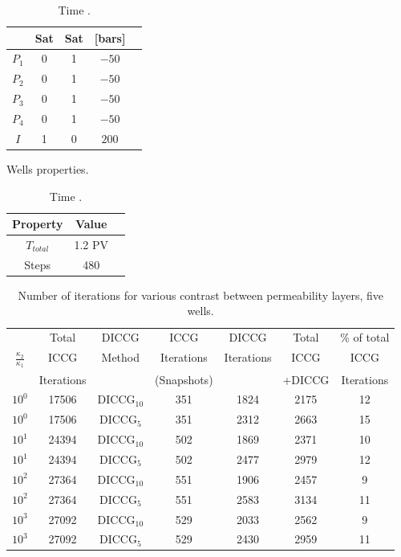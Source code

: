 \documentclass[12pt]{article}
\begin{document}
{\begin{table}[!ht]
\begin{minipage}{.5\textwidth}
\begin{tabular}{ |c|c|c|c|c|}
&Sat&Sat&[bars]\\
\hline
$P_1$&     0&    1 & $-50$ \\  
$P_2$& 0& 1& $-50$ \\
$P_3$&     0&    1 & $-50$  \\  
$P_4$& 0& 1& $-50$ \\
$I$&     1&    0 & $200$ \\  
\hline
\end{tabular}
\caption{Wells properties.}\label{table:wells5}
\end{minipage}%
\begin{minipage}{.4\textwidth}
\centering
\begin{tabular}{ |c|c|c|} 
\hline
Property&Value\\
\hline
    $T_{total}$&     1.2 PV\\
Steps& 480 \\
\hline
\end{tabular}\caption{Time%
.}
\label{table:ic5w}
\end{minipage}
\hspace{1cm} 
\end{table} 



\begin{table}[!ht]\centering
\begin{minipage}{1\textwidth}
 \centering
\begin{tabular}{ ||c|c||c|c|c|c|c||} 
\hline
&Total& DICCG & ICCG&DICCG &Total&\% of total\\ 
         $\frac{\kappa_2}{\kappa_1}$  & ICCG       & Method & Iterations & Iterations&ICCG& ICCG\\ 
                           &  Iterations&        &  (Snapshots)   & &+DICCG&Iterations \\
\hline   
$10^{0}$ &17506& DICCG$_{10}$&351&1824&2175&12 \\ 
\hline  
$10^{0}$ &17506& DICCG$_{5}$&351&2312&2663&15 \\ 
\hline  
$10^{1}$ &24394& DICCG$_{10}$&502&1869&2371&10 \\ 
\hline  
$10^{1}$ &24394& DICCG$_{5}$&502&2477&2979&12 \\ 
\hline  
$10^{2}$ &27364& DICCG$_{10}$&551&1906&2457&9 \\ 
\hline  
$10^{2}$ &27364& DICCG$_{5}$&551&2583&3134&11 \\ 
\hline 
$10^{3}$ &27092& DICCG$_{10}$&529&2033&2562&9 \\ 
\hline  
$10^{3}$ &27092& DICCG$_{5}$&529&2430&2959&11 \\ 
\hline  
\end{tabular} 
\caption{Number of iterations  for various contrast between permeability layers, five wells.}\label{table:litertotw1} 
\end{minipage}  
\end{table} 

}
\end{document}
